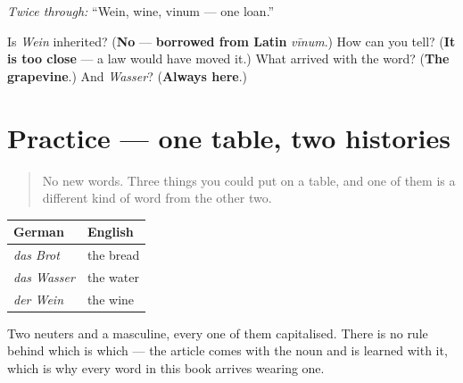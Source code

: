 \emph{Twice through:} \textquotedblleft{}Wein, wine, vinum — one loan.\textquotedblright{}

\begin{tcolorbox}[breakable,colback=teal!4,colframe=teal!35!black,title={Before you move on}]
Is \emph{Wein} inherited? (\textbf{No} — \textbf{borrowed from Latin} \emph{vīnum}.) How can you tell? (\textbf{It is too close} — a law would have moved it.) What arrived with the word? (\textbf{The grapevine}.) And \emph{Wasser}? (\textbf{Always here}.)
\end{tcolorbox}
\section[Practice]{Practice — one table, two histories}

\label{lesson:GE-C11-wasser-wein}



\begin{quote}
No new words. Three things you could put on a table, and one of them is a different kind of word from the other two.
\end{quote}

\begin{grammarlens}[title={Grammar Lens: three nouns, three articles}]
\noindent
\begin{tabularx}{\linewidth}{@{}>{\raggedright\arraybackslash}X>{\raggedright\arraybackslash}X@{}}
\toprule
\textbf{German} & \textbf{English} \\
\midrule
\emph{das Brot} & the bread \\
\emph{das Wasser} & the water \\
\emph{der Wein} & the wine \\
\bottomrule
\end{tabularx}

Two neuters and a masculine, every one of them capitalised. There is no rule behind which is which — the article comes with the noun and is learned with it, which is why every word in this book arrives wearing one.
\end{grammarlens}

